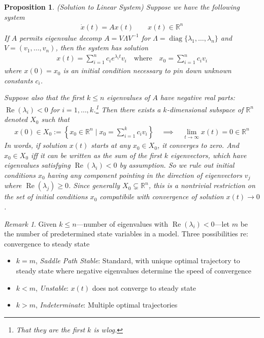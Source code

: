 \documentclass[12pt]{article}
\numberwithin{equation}{section} %
\theoremstyle{plain}
\newtheorem{prop}[thm]{Proposition}
\theoremstyle{definition}
\theoremstyle{remark}
\newtheorem*{rmk}{Remark}
\newcommand{\limt}{\lim_{t\rightarrow\infty}}
\newcommand{\ra}{\rightarrow}
\newcommand{\diag}{\operatorname{diag}}
\newcommand{\dx}{\dot{x}}
\newcommand{\Rn}{\mathbb{R}^n}
\renewcommand{\Re}{\operatorname{Re}}
\newcommand{\sumin}{\sum^n_{i=1}}
\begin{document}
\begin{prop}
\emph{(Solution to Linear System)}
\label{prop:sysdiffeq}
Suppose we have the following system
\begin{align*}
  \dx(t) = Ax(t)
  \qquad x(t)\in\Rn
\end{align*}
If $A$ permits eigenvalue decomp $A=V\Lambda V^{-1}$
for $\Lambda=\diag\{\lambda_1,\ldots,\lambda_n\}$ and
$V=(v_1,\ldots,v_n)$,
then the system has solution
\begin{align*}
  x(t) = \sumin c_i e^{\lambda_i t}v_i
  \quad\text{where}\quad
  x_0=\sumin c_iv_i
\end{align*}
where $x(0)=x_0$ is an initial condition necessary to pin down unknown
constants $c_i$.

Suppose also that the first $k\leq n$ eigenvalues of $A$ have negative
real parts: $\Re(\lambda_i)<0$ for $i=1,\ldots,k$.\footnote{%
  That they are the \emph{first} $k$ is wlog.
}
Then there exists a $k$-dimensional subspace of $\Rn$ denoted $X_0$
such that
\begin{align*}
  x(0)\in X_0
  :=
  \left\{
    x_0\in\Rn \;\big|\;
    x_0 = \sum_{i=1}^k c_i v_i
  \right\}
  \quad\implies\quad
  \limt x(t) = 0\in\Rn
\end{align*}
In words, if solution $x(t)$ starts at any $x_0\in X_0$, it converges to
zero.
And $x_0\in X_0$ iff it can be written as the sum of the
first $k$ eigenvectors, which have eigenvalues satisfying
$\Re(\lambda_i)<0$ by assumption.
So we rule out initial conditions $x_0$ having any component pointing in
the direction of eigenvectors $v_j$ where $\Re(\lambda_j)\geq 0$.
Since generally $X_0\subsetneq \Rn$, this is a nontrivial
restriction on the set of initial conditions $x_0$ compatibile with
convergence of solution $x(t)\ra 0$.
\end{prop}
\begin{rmk}
Given $k\leq n$---number of eigenvalues with $\Re(\lambda_i)<0$---let
$m$ be the number of predetermined state variables in a model.
Three possibilities re: convergence to steady state
\begin{itemize}
  \item $k=m$, \emph{Saddle Path Stable}:
    Standard, with unique optimal trajectory to steady state where
    negative eigenvalues determine the speed of convergence
  \item $k< m$, \emph{Unstable}: $x(t)$ does not converge to steady state
  \item $k>m$, \emph{Indeterminate}: Multiple optimal trajectories
\end{itemize}
\end{rmk}
\end{document}
